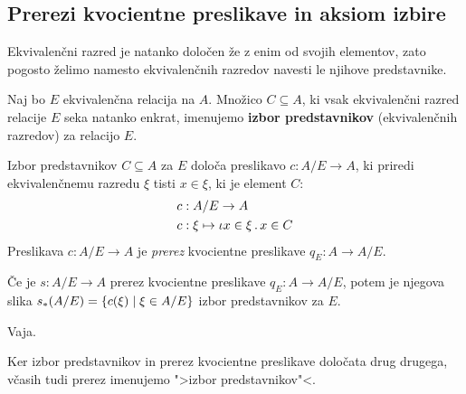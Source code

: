 \subsection{Prerezi kvocientne preslikave in aksiom izbire}

Ekvivalenčni razred je natanko določen že z enim od svojih elementov, zato pogosto želimo
namesto ekvivalenčnih razredov navesti le njihove predstavnike.

\begin{definicija}
  Naj bo $E$ ekvivalenčna relacija na $A$. Množico $C \subseteq A$, ki vsak
  ekvivalenčni razred relacije $E$ seka natanko enkrat, imenujemo \textbf{izbor predstavnikov}
  (ekvivalenčnih razredov) za relacijo $E$.
\end{definicija}

Izbor predstavnikov $C \subseteq A$ za $E$ določa preslikavo $c : A/E \to A$, ki priredi
ekvivalenčnemu razredu $\xi$ tisti $x \in \xi$, ki je element $C$:
%
\begin{align*}
  c &: A/E \to A \\
  c &: \xi \mapsto \iota x \in \xi \,.\, x \in C
\end{align*}
%
Preslikava $c : A/E \to A$ je \emph{prerez} kvocientne preslikave $q_E : A \to A/E$.

\begin{izjava}
  Če je $s : A/E \to A$ prerez kvocientne preslikave $q_E : A \to A/E$, potem je
  njegova slika $s_{*}(A/E) = \left\{ c(\xi) \; \middle| \; \xi \in A/E \right\}$ izbor predstavnikov za $E$.
\end{izjava}

\begin{dokaz}
  Vaja.
\end{dokaz}

Ker izbor predstavnikov in prerez kvocientne preslikave določata drug drugega, včasih tudi
prerez imenujemo ">izbor predstavnikov"<.

